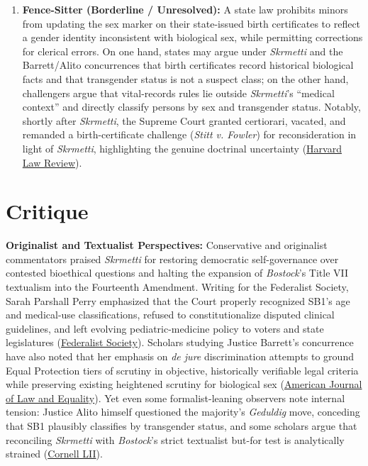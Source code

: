 \documentclass[12pt]{article}
\begin{document}
\begin{enumerate}
\item \textbf{Fence-Sitter (Borderline / Unresolved):} A state law prohibits minors from updating the sex marker on their state-issued birth certificates to reflect a gender identity inconsistent with biological sex, while permitting corrections for clerical errors. On one hand, states may argue under \textit{Skrmetti} and the Barrett/Alito concurrences that birth certificates record historical biological facts and that transgender status is not a suspect class; on the other hand, challengers argue that vital-records rules lie outside \textit{Skrmetti}'s ``medical context'' and directly classify persons by sex and transgender status. Notably, shortly after \textit{Skrmetti}, the Supreme Court granted certiorari, vacated, and remanded a birth-certificate challenge (\textit{Stitt v. Fowler}) for reconsideration in light of \textit{Skrmetti}, highlighting the genuine doctrinal uncertainty (\href{https://harvardlawreview.org/print/vol-139/skrmetti-beyond-scrutiny/}{Harvard Law Review}).
\end{enumerate}

\section{Critique}

\textbf{Originalist and Textualist Perspectives:} Conservative and originalist commentators praised \textit{Skrmetti} for restoring democratic self-governance over contested bioethical questions and halting the expansion of \textit{Bostock}'s Title VII textualism into the Fourteenth Amendment. Writing for the Federalist Society, Sarah Parshall Perry emphasized that the Court properly recognized SB1's age and medical-use classifications, refused to constitutionalize disputed clinical guidelines, and left evolving pediatric-medicine policy to voters and state legislatures (\href{https://fedsoc.org/commentary/fedsoc-blog/supreme-court-upholds-tennessee-s-ban-on-gender-affirming-care-for-minors-in-united-states-v-skrmetti}{Federalist Society}). Scholars studying Justice Barrett's concurrence have also noted that her emphasis on \textit{de jure} discrimination attempts to ground Equal Protection tiers of scrutiny in objective, historically verifiable legal criteria while preserving existing heightened scrutiny for biological sex (\href{https://direct.mit.edu/ajle/article/doi/10.1162/AJLE.a.107/139252/AMY-CONEY-BARRETT-S-SEX-EQUALITY-CONSTITUTION-The}{American Journal of Law and Equality}). Yet even some formalist-leaning observers note internal tension: Justice Alito himself questioned the majority's \textit{Geduldig} move, conceding that SB1 plausibly classifies by transgender status, and some scholars argue that reconciling \textit{Skrmetti} with \textit{Bostock}'s strict textualist but-for test is analytically strained (\href{https://www.law.cornell.edu/supremecourt/text/23-477}{Cornell LII}).
\end{document}
